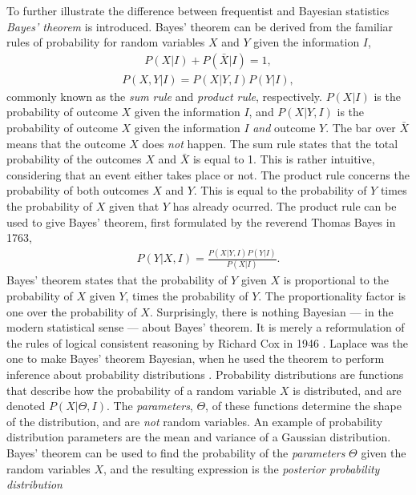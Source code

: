 \documentclass[twoside,english]{uiofysmaster}
\begin{document}
{To further illustrate the difference between frequentist and Bayesian statistics \textit{Bayes' theorem} \cite{mr1763essay} is introduced. Bayes' theorem can be derived from the familiar rules of probability for random variables $X$ and $Y$ given the information $I$,
\begin{align}\label{Eq:: gaussian process : Sum rule}
P(X | I) + P(\bar{X} | I) = 1,
\end{align}
\begin{align}
 \label{Eq:: gaussian process : Product rule}
P(X, Y | I) = P(X | Y, I)  P(Y | I),
\end{align} 
commonly known as the \textit{sum rule} and \textit{product rule}, respectively. $P(X|I)$ is the probability of outcome $X$ given the information $I$, and $P(X|Y,I)$ is the probability of outcome $X$ given the information $I$ \textit{and} outcome $Y$. The bar over $\bar{X}$ means that the outcome $X$ does \textit{not} happen. The sum rule states that the total probability of the outcomes $X$ and $\bar{X}$ is equal to 1. This is rather intuitive, considering that an event either takes place or not. The product rule concerns the probability of both outcomes $X$ and $Y$. This is equal to the probability of $Y$ times the probability of $X$ given that $Y$ has already ocurred. The product rule can be used to give Bayes' theorem, first formulated by the reverend Thomas Bayes in 1763,
\begin{align}\label{Eq:: gaussian process : Bayes theorem}
P(Y | X, I) = \frac{P(X | Y, I)  P(Y | I)}{P(X | I)}.
\end{align}
Bayes' theorem states that the probability of $Y$ given $X$ is proportional to the probability of $X$ given $Y$, times the probability of $Y$. The proportionality factor is one over the probability of $X$. Surprisingly, there is nothing Bayesian --- in the modern statistical sense ---  about Bayes' theorem. It is merely a reformulation of the rules of logical consistent reasoning by Richard Cox in 1946 \cite{sivia2006data}. Laplace was the one to make Bayes' theorem Bayesian, when he used the theorem to perform inference about probability distributions \cite{laplace1820theorie}. Probability distributions are functions that describe how the probability of a random variable $X$ is distributed, and are denoted $P(X| \Theta, I)$. The \textit{parameters}, $\Theta$, of these functions determine the shape of the distribution, and are \textit{not} random variables. An example of probability distribution parameters are the mean and variance of a Gaussian distribution. Bayes' theorem can be used to find the probability of the \textit{parameters} $\Theta$ given the random variables $X$, and the resulting expression is the \textit{posterior probability distribution}
}
\end{document}
